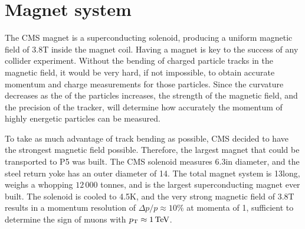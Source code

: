
\section{Magnet system \label{sec:cms_magnet}}

The CMS magnet is a superconducting solenoid, producing a uniform magnetic field of 3.8\unit{T}
inside the magnet coil. 
Having a magnet is key to the success of any collider experiment. Without the bending of charged
particle tracks in the magnetic field, it would be very hard, if not impossible, to obtain
accurate momentum and charge measurements for those particles. 
Since the curvature decreases as the \pt of the particles increases, the strength of the magnetic
field, and the precision of the tracker, will determine how accurately the momentum of highly
energetic particles can be measured. 

To take as much advantage of track bending as possible, CMS decided to have the strongest magnetic
field possible. Therefore, the largest magnet that could be transported to P5 was built. The CMS
solenoid measures 6.3\meter in diameter, and the steel return yoke has an outer diameter of
14\meter. The total magnet system is 13\meter long, weighs a whopping $12\,000$ tonnes,
and is the largest superconducting magnet ever built. The solenoid is cooled to 4.5\unit{K}, and the
very strong magnetic field of 3.8\unit{T} results in a momentum resolution of $\Delta p / p \approx
10\%$ at momenta of 1\TeV, sufficient to determine the sign of muons with $p_{\mathrm{T}} \approx 1 \,\text{Te\hspace{-.08em}V}$. 

